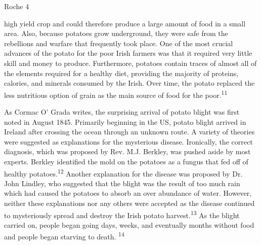 \begin{Spacing}{1.5}
\newpage
\thispagestyle{empty}
\begin{flushright}Roche 4\end{flushright}

high yield crop and could therefore produce a large amount of food in a small area. Also, because potatoes grow underground, they were safe from the rebellions and warfare that frequently took place. One of the most crucial advances of the potato for the poor Irish farmers was that it required very little skill and money to produce. Furthermore, potatoes contain traces of almost all of the elements required for a healthy diet, providing the majority of proteins, calories, and minerals consumed by the Irish. Over time, the potato replaced the less nutritious option of grain as the main source of food for the poor.\textsuperscript{11} 

\hspace{.4in}As Cormac O’ Grada writes, the surprising arrival of potato blight was first noted in August 1845. Primarily beginning in the US, potato blight arrived in Ireland after crossing the ocean through an unknown route. A variety of theories were suggested as explanations for the mysterious disease. Ironically, the correct diagnosis, which was proposed by Rev. M.J. Berkley, was pushed aside by most experts. Berkley identified the mold on the potatoes as a fungus that fed off of healthy potatoes.\textsuperscript{12} Another explanation for the disease was proposed by Dr. John Lindley, who suggested that the blight was the result of too much rain which had caused the potatoes to absorb an over abundance of water. However, neither these explanations nor any others were accepted as the disease continued to mysteriously spread and destroy the Irish potato harvest.\textsuperscript{13}  As the blight carried on, people began going days, weeks, and eventually months without food and people began starving to death. \textsuperscript{14} 


\end{Spacing}
